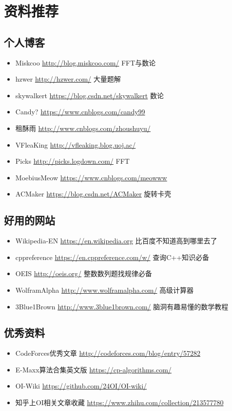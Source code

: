 \chapter{资料推荐}
\section{个人博客}
\begin{itemize}
	\item Miskcoo \url{http://blog.miskcoo.com/} FFT与数论
	\item hzwer \url{http://hzwer.com/} 大量题解
    \item skywalkert \url{https://blog.csdn.net/skywalkert} 数论
    \item Candy? \url{https://www.cnblogs.com/candy99}
    \item 租酥雨 \url{http://www.cnblogs.com/zhoushuyu/}
    \item VFleaKing \url{http://vfleaking.blog.uoj.ac/}
    \item Picks \url{http://picks.logdown.com/} FFT
    \item MoebiusMeow \url{https://www.cnblogs.com/meowww}
    \item ACMaker \url{https://blog.csdn.net/ACMaker} 旋转卡壳
\end{itemize}
\section{好用的网站}
\begin{itemize}
    \item Wikipedia-EN \url{https://en.wikipedia.org} 比百度不知道高到哪里去了
    \item cppreference \url{https://en.cppreference.com/w/} 查询C++知识必备
    \item OEIS \url{http://oeis.org/} 整数数列题找规律必备
    \item WolframAlpha \url{http://www.wolframalpha.com/} 高级计算器
    \item 3Blue1Brown \url{http://www.3blue1brown.com/} 脑洞有趣易懂的数学教程
\end{itemize}
\section{优秀资料}
\begin{itemize}
    \item CodeForces优秀文章 \url{http://codeforces.com/blog/entry/57282}
    \item E-Maxx算法合集英文版 \url{https://cp-algorithms.com/}
    \item OI-Wiki \url{https://github.com/24OI/OI-wiki/}
    \item 知乎上OI相关文章收藏 \url{https://www.zhihu.com/collection/213577780}
\end{itemize}

